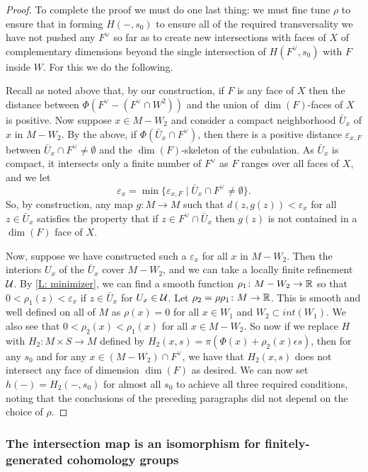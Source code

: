 \begin{proof}
	To complete the proof we must do one last thing: we must fine tune $\rho$ to ensure that in forming $H(-,s_0)$ to ensure all of the required transversality we have not pushed any $F^\vee$ so far as to create new intersections with faces of $X$ of complementary dimensions beyond the single intersection of $H(F^\vee,s_0)$ with $F$ inside $W$.
	For this we do the following.

	Recall as noted above that, by our construction, if $F$ is any face of $X$ then the distance between $\Phi(F^\vee-(F^\vee \cap W^2))$ and the union of $\dim(F)$-faces of $X$ is positive.
	Now suppose $x \in M-W_2$ and consider a compact neighborhood $\bar U_x$ of $x$ in $M-W_2$.
	By the above, if $\Phi(\bar U_x \cap F^\vee)$, then there is a positive distance $\varepsilon_{x,F}$ between $\bar U_x \cap F^\vee\neq \emptyset$ and the $\dim(F)$-skeleton of the cubulation.
	As $\bar U_x$ is compact, it intersects only a finite number of $F^\vee$ as $F$ ranges over all faces of $X$, and we let $$\varepsilon_x = \min\{\varepsilon_{x,F} \mid \bar U_x \cap F^\vee\neq \emptyset\}.$$
	So, by construction, any map $g \colon M \to M$ such that $d(z,g(z))<\varepsilon_x$ for all $z \in \bar U_x$ satisfies the property that if $z \in F^\vee \cap \bar U_x$ then $g(z)$ is not contained in a $\dim(F)$ face of $X$.

	Now, suppose we have constructed such a $\varepsilon_x$ for all $x$ in $M-W_2$.
	Then the interiors $U_x$ of the $\bar U_x$ cover $M-W_2$, and we can take a locally finite refinement $\mathcal{U}$.
	By \cref{L: minimizer}, we can find a smooth function $\rho_1 \colon M-W_2 \to \mathbb{R}$ so that $0<\rho_1(z)<\varepsilon_x$ if $z \in \bar U_x$ for $U_x \in \mathcal{U}$.
	Let $\rho_2 = \rho\rho_1 \colon M \to \mathbb{R}$.
	This is smooth and well defined on all of $M$ as $\rho(x) = 0$ for all $x \in W_1$ and $W_2 \subset int(W_1)$.
	We also see that $0<\rho_2(x)<\rho_1(x)$ for all $x \in M-W_2$.
	So now if we replace $H$ with $H_2 \colon M \times S \to M$ defined by $H_2(x,s) = \pi(\Phi(x)+\rho_2(x)\epsilon s)$, then for any $s_0$ and for any $x \in (M-W_2) \cap F^\vee$, we have that $H_2(x,s)$ does not intersect any face of dimension $\dim(F)$ as desired.
	We can now set $h(-) = H_2(-,s_0)$ for almost all $s_0$ to achieve all three required conditions, noting that the conclusions of the preceding paragraphs did not depend on the choice of $\rho$.
\end{proof}

\subsubsection{The intersection map is an isomorphism for finitely-generated cohomology groups}


